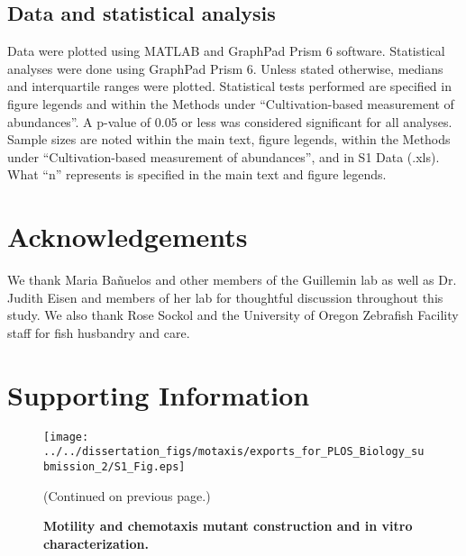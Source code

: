 {{{{{{{\subsection{Data and statistical analysis}

Data were plotted using MATLAB and GraphPad Prism 6 software. Statistical analyses were done using GraphPad Prism 6. Unless stated otherwise, medians and interquartile ranges were plotted. Statistical tests performed are specified in figure legends and within the Methods under ``Cultivation-based measurement of abundances''. A p-value of 0.05 or less was considered significant for all analyses. Sample sizes are noted within the main text, figure legends, within the Methods under ``Cultivation-based measurement of abundances'', and in S1 Data (.xls). What ``n'' represents is specified in the main text and figure legends. 

\section{Acknowledgements}
We thank Maria Bañuelos and other members of the Guillemin lab as well as Dr. Judith Eisen and members of her lab for thoughtful discussion throughout this study. We also thank Rose Sockol and the University of Oregon Zebrafish Facility staff for fish husbandry and care.


\newpage
\section{Supporting Information}

\renewcommand\thefigure{S\arabic{figure}}    
\begin{figure}%
	\centerline{
		\texttt{[image: ../../dissertation\_figs/motaxis/exports\_for\_PLOS\_Biology\_submission\_2/S1\_Fig.eps]}}
	\caption{\textbf{Motility and chemotaxis mutant construction and in vitro characterization.}}{(Continued on previous page.)}
	\label{fig:motaxis_figS1}
\end{figure}

}}}}}}}

